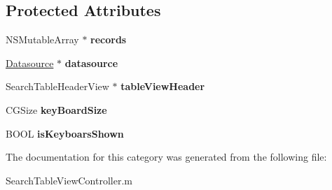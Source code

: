 \subsection*{Protected Attributes}
\begin{DoxyCompactItemize}
\item 
N\+S\+Mutable\+Array $\ast$ {\bfseries records}\hypertarget{category_search_table_view_controller_07_08_ae3288afb650ab4587b25d2dd50cdf97d}{}\label{category_search_table_view_controller_07_08_ae3288afb650ab4587b25d2dd50cdf97d}

\item 
\hyperlink{interface_datasource}{Datasource} $\ast$ {\bfseries datasource}\hypertarget{category_search_table_view_controller_07_08_aa1e8fac382dc682d16f1e571fe14875c}{}\label{category_search_table_view_controller_07_08_aa1e8fac382dc682d16f1e571fe14875c}

\item 
Search\+Table\+Header\+View $\ast$ {\bfseries table\+View\+Header}\hypertarget{category_search_table_view_controller_07_08_aed894757b8eb218f1af83d691460f3c4}{}\label{category_search_table_view_controller_07_08_aed894757b8eb218f1af83d691460f3c4}

\item 
C\+G\+Size {\bfseries key\+Board\+Size}\hypertarget{category_search_table_view_controller_07_08_a52ca0874e03df88c74df635e7cab0811}{}\label{category_search_table_view_controller_07_08_a52ca0874e03df88c74df635e7cab0811}

\item 
B\+O\+OL {\bfseries is\+Keyboars\+Shown}\hypertarget{category_search_table_view_controller_07_08_a4386b529aa97903674e472a4a14a72c0}{}\label{category_search_table_view_controller_07_08_a4386b529aa97903674e472a4a14a72c0}

\end{DoxyCompactItemize}


The documentation for this category was generated from the following file\+:\begin{DoxyCompactItemize}
\item 
Search\+Table\+View\+Controller.\+m\end{DoxyCompactItemize}
